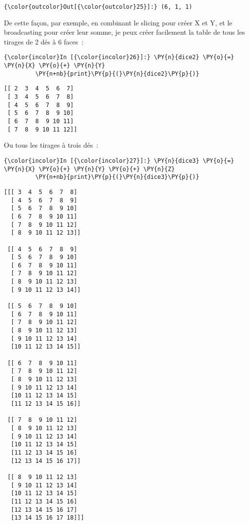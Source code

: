 \begin{Verbatim}[commandchars=\\\{\}]
{\color{outcolor}Out[{\color{outcolor}25}]:} (6, 1, 1)
\end{Verbatim}
            
    De cette façon, par exemple, en combinant le slicing pour créer X et Y,
et le broadcasting pour créer leur somme, je peux créer facilement la
table de tous les tirages de 2 dés à 6 faces~:

    \begin{Verbatim}[commandchars=\\\{\}]
{\color{incolor}In [{\color{incolor}26}]:} \PY{n}{dice2} \PY{o}{=} \PY{n}{X} \PY{o}{+} \PY{n}{Y}
         \PY{n+nb}{print}\PY{p}{(}\PY{n}{dice2}\PY{p}{)}
\end{Verbatim}


    \begin{Verbatim}[commandchars=\\\{\}]
[[ 2  3  4  5  6  7]
 [ 3  4  5  6  7  8]
 [ 4  5  6  7  8  9]
 [ 5  6  7  8  9 10]
 [ 6  7  8  9 10 11]
 [ 7  8  9 10 11 12]]

    \end{Verbatim}

    Ou tous les tirages à trois dés~:

    \begin{Verbatim}[commandchars=\\\{\}]
{\color{incolor}In [{\color{incolor}27}]:} \PY{n}{dice3} \PY{o}{=} \PY{n}{X} \PY{o}{+} \PY{n}{Y} \PY{o}{+} \PY{n}{Z}
         \PY{n+nb}{print}\PY{p}{(}\PY{n}{dice3}\PY{p}{)}
\end{Verbatim}


    \begin{Verbatim}[commandchars=\\\{\}]
[[[ 3  4  5  6  7  8]
  [ 4  5  6  7  8  9]
  [ 5  6  7  8  9 10]
  [ 6  7  8  9 10 11]
  [ 7  8  9 10 11 12]
  [ 8  9 10 11 12 13]]

 [[ 4  5  6  7  8  9]
  [ 5  6  7  8  9 10]
  [ 6  7  8  9 10 11]
  [ 7  8  9 10 11 12]
  [ 8  9 10 11 12 13]
  [ 9 10 11 12 13 14]]

 [[ 5  6  7  8  9 10]
  [ 6  7  8  9 10 11]
  [ 7  8  9 10 11 12]
  [ 8  9 10 11 12 13]
  [ 9 10 11 12 13 14]
  [10 11 12 13 14 15]]

 [[ 6  7  8  9 10 11]
  [ 7  8  9 10 11 12]
  [ 8  9 10 11 12 13]
  [ 9 10 11 12 13 14]
  [10 11 12 13 14 15]
  [11 12 13 14 15 16]]

 [[ 7  8  9 10 11 12]
  [ 8  9 10 11 12 13]
  [ 9 10 11 12 13 14]
  [10 11 12 13 14 15]
  [11 12 13 14 15 16]
  [12 13 14 15 16 17]]

 [[ 8  9 10 11 12 13]
  [ 9 10 11 12 13 14]
  [10 11 12 13 14 15]
  [11 12 13 14 15 16]
  [12 13 14 15 16 17]
  [13 14 15 16 17 18]]]

    \end{Verbatim}

